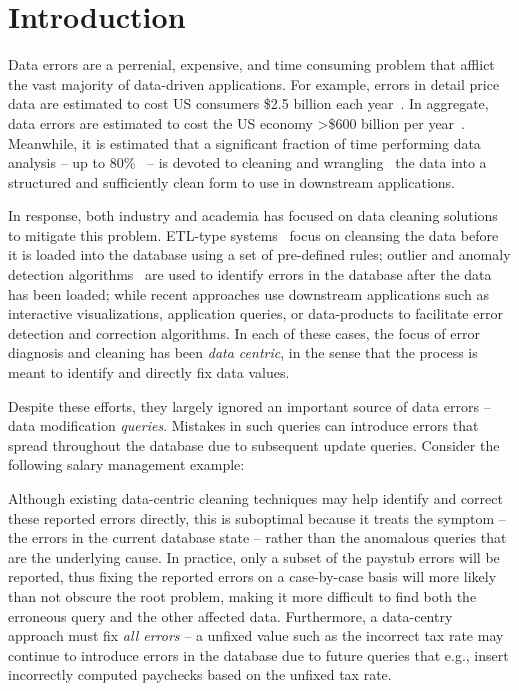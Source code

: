 
\section{Introduction}
\label{s:intro}

Data errors are a perrenial, expensive, and time consuming problem that afflict the vast majority of data-driven applications.
For example, errors in detail price data are estimated to cost US consumers \$2.5 billion each year~\cite{Fan2008}.
In aggregate, data errors are estimated to cost the US economy >\$600 billion per year~\cite{eckerson2002}.
Meanwhile, it is estimated that a significant fraction of time performing data analysis --
up to 80\%~\cite{kandel2012} -- is devoted to cleaning and
wrangling~\cite{kandel2011wrangler} the data into a structured and sufficiently clean form to use in downstream applications.

In response, both industry and academia has focused on data cleaning solutions to mitigate this problem.
ETL-type systems~\cite{systemt,informatica} focus on cleansing the data before it is loaded into the database
using a set of pre-defined rules; outlier and anomaly detection algorithms~\cite{} are used to identify errors
in the database after the data has been loaded; while recent approaches use downstream applications
such as interactive visualizations, application queries, or data-products to facilitate error detection and correction algorithms.
In each of these cases, the focus of error diagnosis and cleaning has been {\it data centric}, in the sense that
the process is meant to identify and directly fix data values.

Despite these efforts, they largely ignored an important source of data errors -- data modification {\it queries}.
Mistakes in such queries can introduce errors that spread throughout the database due to subsequent update queries.
Consider the following salary management example:


% 

Although existing data-centric cleaning techniques may help identify and correct these reported errors directly, 
this is suboptimal because it treats the symptom -- the errors in the current database state -- rather than the anomalous
queries that are the underlying cause.  In practice, only a subset of the paystub errors will be reported, thus fixing
the reported errors on a case-by-case basis will more likely than not obscure the root problem, making it more difficult to
find both the erroneous query and the other affected data.  
Furthermore, a data-centry approach must fix {\it all errors} -- a unfixed value such as the incorrect tax rate
may continue to introduce errors in the database due to future queries that 
e.g., insert incorrectly computed paychecks based on the unfixed tax rate.

